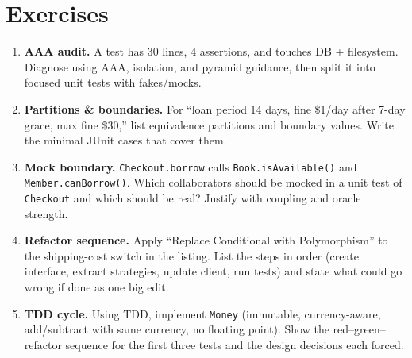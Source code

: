 \section{Exercises}
\label{sec:ch08-exercises}
\begin{enumerate}[label=E8.\arabic*, leftmargin=*, itemsep=0.8em]
    \item \textbf{AAA audit.} A test has 30 lines, 4 assertions, and touches DB + filesystem. Diagnose using AAA, isolation, and pyramid guidance, then split it into focused unit tests with fakes/mocks.
    \item \textbf{Partitions \& boundaries.} For ``loan period 14 days, fine \$1/day after 7-day grace, max fine \$30,'' list equivalence partitions and boundary values. Write the minimal JUnit cases that cover them.
    \item \textbf{Mock boundary.} \texttt{Checkout.borrow} calls \texttt{Book.isAvailable()} and \texttt{Member.canBorrow()}. Which collaborators should be mocked in a unit test of \texttt{Checkout} and which should be real? Justify with coupling and oracle strength.
    \item \textbf{Refactor sequence.} Apply ``Replace Conditional with Polymorphism'' to the shipping-cost switch in the listing. List the steps in order (create interface, extract strategies, update client, run tests) and state what could go wrong if done as one big edit.
    \item \textbf{TDD cycle.} Using TDD, implement \texttt{Money} (immutable, currency-aware, add/subtract with same currency, no floating point). Show the red--green--refactor sequence for the first three tests and the design decisions each forced.
\end{enumerate}
